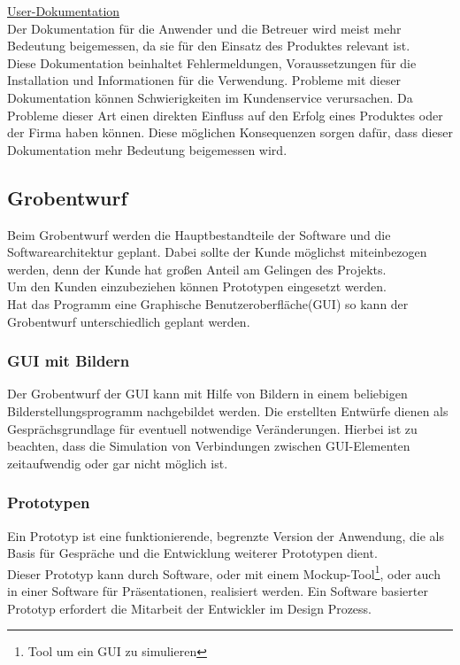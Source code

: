\documentclass[12pt,a4paper]{article}
\begin{document}
\underline{User-Dokumentation}\\
Der Dokumentation für die Anwender und die Betreuer wird meist mehr Bedeutung beigemessen, da sie für den Einsatz des Produktes relevant ist.\\
Diese Dokumentation beinhaltet Fehlermeldungen, Voraussetzungen für die Installation und Informationen für die Verwendung. Probleme mit dieser Dokumentation können Schwierigkeiten im Kundenservice verursachen. Da Probleme dieser Art einen direkten Einfluss auf den Erfolg eines Produktes oder der Firma haben können. Diese möglichen Konsequenzen sorgen dafür, dass dieser Dokumentation mehr Bedeutung beigemessen wird\cite{THEUNISSEN2022106733}.

\subsection{Grobentwurf}
Beim Grobentwurf werden die Hauptbestandteile der Software und die Softwarearchitektur geplant. Dabei sollte der Kunde möglichst miteinbezogen werden, denn der Kunde hat großen Anteil am Gelingen des Projekts\cite{10.1145/1060710.1060712}. \\
Um den Kunden einzubeziehen können Prototypen eingesetzt werden.\\
Hat das Programm eine Graphische Benutzeroberfläche(GUI) so kann der Grobentwurf unterschiedlich geplant werden. \\
\subsubsection{GUI mit Bildern}
\label{GUI mit Bildern}
Der Grobentwurf der GUI kann mit Hilfe von Bildern in einem beliebigen Bilderstellungsprogramm nachgebildet werden. Die erstellten Entwürfe dienen als Gesprächsgrundlage für eventuell notwendige Veränderungen. Hierbei ist zu beachten, dass die Simulation von Verbindungen zwischen GUI-Elementen zeitaufwendig oder gar nicht möglich ist.
\subsubsection{Prototypen}
\label{Prototypen}
Ein Prototyp ist eine funktionierende, begrenzte Version der Anwendung, die als Basis für Gespräche und die Entwicklung weiterer Prototypen dient\cite{budde1992prototyping}. \\
Dieser Prototyp kann durch Software, oder mit einem Mockup-Tool\footnote{Tool um ein GUI zu simulieren}, oder auch in einer Software für Präsentationen, realisiert werden. Ein Software basierter Prototyp erfordert die Mitarbeit der Entwickler im Design Prozess. 
\end{document}
